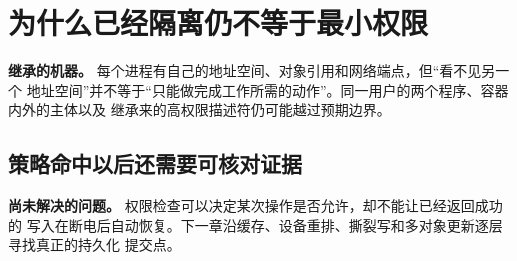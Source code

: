 \chapter{为什么已经隔离仍不等于最小权限}

\begin{statebox}
\textbf{继承的机器。} 每个进程有自己的地址空间、对象引用和网络端点，但“看不见另一个
地址空间”并不等于“只能做完成工作所需的动作”。同一用户的两个程序、容器内外的主体以及
继承来的高权限描述符仍可能越过预期边界。
\end{statebox}


\section{策略命中以后还需要可核对证据}

\begin{problemframe}
\textbf{尚未解决的问题。} 权限检查可以决定某次操作是否允许，却不能让已经返回成功的
写入在断电后自动恢复。下一章沿缓存、设备重排、撕裂写和多对象更新逐层寻找真正的持久化
提交点。
\end{problemframe}

